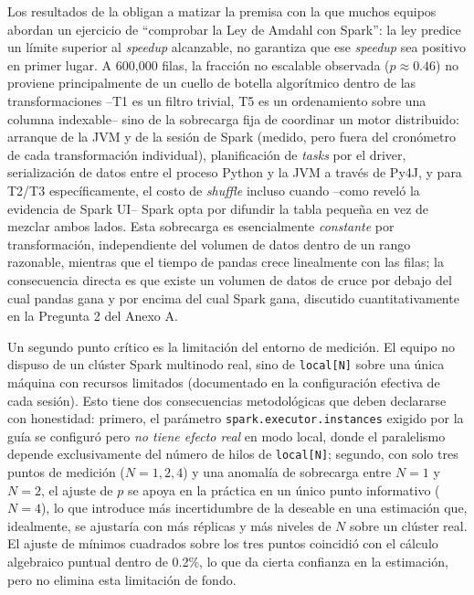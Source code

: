 \documentclass[11pt,a4paper]{article}
\begin{document}
    Los resultados de la  obligan a matizar la premisa con la que muchos
    equipos abordan un ejercicio de \enquote{comprobar la Ley de Amdahl con Spark}: la ley predice
    un límite superior al \emph{speedup} alcanzable, no garantiza que ese \emph{speedup} sea
    positivo en primer lugar. A 600{,}000 filas, la fracción no escalable observada
    ($p\approx0.46$) no proviene principalmente de un cuello de botella algorítmico dentro de las
    transformaciones --T1 es un filtro trivial, T5 es un ordenamiento sobre una columna indexable--
    sino de la sobrecarga fija de coordinar un motor distribuido: arranque de la JVM y de la sesión
    de Spark (medido, pero fuera del cronómetro de cada transformación individual), planificación de
    \emph{tasks} por el driver, serialización de datos entre el proceso Python y la JVM a través de
    Py4J, y para T2/T3 específicamente, el costo de \emph{shuffle} incluso cuando --como reveló la
    evidencia de Spark UI-- Spark opta por difundir la tabla pequeña en vez de mezclar ambos lados.
    Esta sobrecarga es esencialmente \emph{constante} por transformación, independiente del volumen
    de datos dentro de un rango razonable, mientras que el tiempo de pandas crece linealmente con
    las filas; la consecuencia directa es que existe un volumen de datos de cruce por debajo del cual
    pandas gana y por encima del cual Spark gana, discutido cuantitativamente en la Pregunta 2 del
    Anexo A.

    Un segundo punto crítico es la limitación del entorno de medición. El equipo no dispuso de un
    clúster Spark multinodo real, sino de \texttt{local[N]} sobre una única máquina con recursos
    limitados (documentado en la configuración efectiva de cada sesión). Esto tiene dos
    consecuencias metodológicas que deben declararse con honestidad: primero, el parámetro
    \texttt{spark.executor.instances} exigido por la guía se configuró pero \emph{no tiene efecto
    real} en modo local, donde el paralelismo depende exclusivamente del número de hilos de
    \texttt{local[N]}; segundo, con solo tres puntos de medición ($N=1,2,4$) y una anomalía de
    sobrecarga entre $N=1$ y $N=2$, el ajuste de $p$ se apoya en la práctica en un único punto
    informativo ($N=4$), lo que introduce más incertidumbre de la deseable en una estimación que,
    idealmente, se ajustaría con más réplicas y más niveles de $N$ sobre un clúster real. El ajuste
    de mínimos cuadrados sobre los tres puntos coincidió con el cálculo algebraico puntual dentro de
    0.2\%, lo que da cierta confianza en la estimación, pero no elimina esta limitación de fondo.
\end{document}
